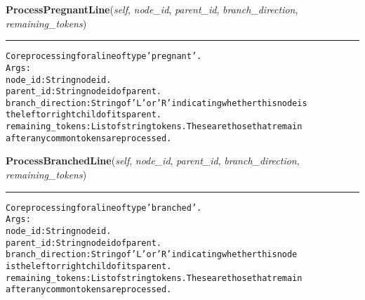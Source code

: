     \label{coinor:grumpy:BB:BBTree:ProcessPregnantLine}

    \vspace{0.5ex}

\hspace{.8\funcindent}\begin{boxedminipage}{\funcwidth}

    \raggedright \textbf{ProcessPregnantLine}(\textit{self}, \textit{node\_id}, \textit{parent\_id}, \textit{branch\_direction}, \textit{remaining\_tokens})

    \vspace{-1.5ex}

    \rule{\textwidth}{0.5\fboxrule}
\setlength{\parskip}{2ex}
\begin{alltt}

Core processing for a line of type 'pregnant'.
Args:
  node\_id: String node id.
  parent\_id: String node id of parent.
  branch\_direction: String of 'L' or 'R' indicating whether this node is
    the left or right child of its parent.
  remaining\_tokens: List of string tokens. These are those that remain
    after any common tokens are processed.
\end{alltt}

\setlength{\parskip}{1ex}
    \end{boxedminipage}

    \label{coinor:grumpy:BB:BBTree:ProcessBranchedLine}

    \vspace{0.5ex}

\hspace{.8\funcindent}\begin{boxedminipage}{\funcwidth}

    \raggedright \textbf{ProcessBranchedLine}(\textit{self}, \textit{node\_id}, \textit{parent\_id}, \textit{branch\_direction}, \textit{remaining\_tokens})

    \vspace{-1.5ex}

    \rule{\textwidth}{0.5\fboxrule}
\setlength{\parskip}{2ex}
\begin{alltt}

Core processing for a line of type 'branched'.
Args:
  node\_id: String node id.
  parent\_id: String node id of parent.
  branch\_direction: String of 'L' or 'R' indicating whether this node
  is the left or right child of its parent.
  remaining\_tokens: List of string tokens. These are those that remain
    after any common tokens are processed.
\end{alltt}

\setlength{\parskip}{1ex}
    \end{boxedminipage}

